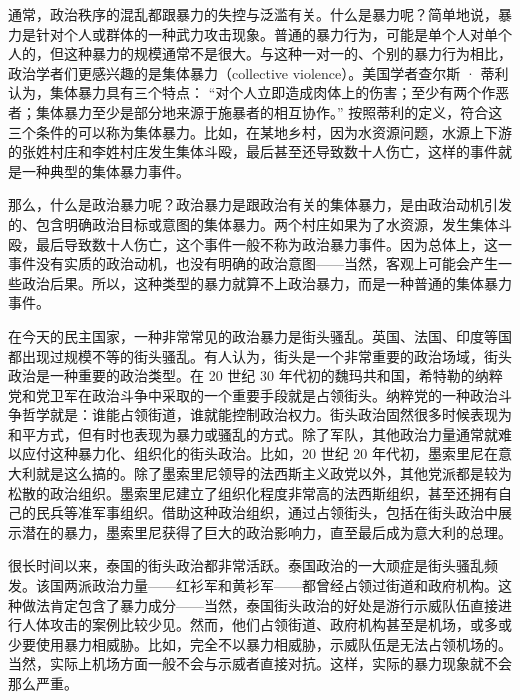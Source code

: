 
通常，政治秩序的混乱都跟暴力的失控与泛滥有关。什么是暴力呢？简单地说，暴力是针对个人或群体的一种武力攻击现象。普通的暴力行为，可能是单个人对单个人的，但这种暴力的规模通常不是很大。与这种一对一的、个别的暴力行为相比，政治学者们更感兴趣的是集体暴力（collective violence）。美国学者查尔斯 · 蒂利认为，集体暴力具有三个特点： “对个人立即造成肉体上的伤害；至少有两个作恶者；集体暴力至少是部分地来源于施暴者的相互协作。” 按照蒂利的定义，符合这三个条件的可以称为集体暴力。比如，在某地乡村，因为水资源问题，水源上下游的张姓村庄和李姓村庄发生集体斗殴，最后甚至还导致数十人伤亡，这样的事件就是一种典型的集体暴力事件。

那么，什么是政治暴力呢？政治暴力是跟政治有关的集体暴力，是由政治动机引发的、包含明确政治目标或意图的集体暴力。两个村庄如果为了水资源，发生集体斗殴，最后导致数十人伤亡，这个事件一般不称为政治暴力事件。因为总体上，这一事件没有实质的政治动机，也没有明确的政治意图——当然，客观上可能会产生一些政治后果。所以，这种类型的暴力就算不上政治暴力，而是一种普通的集体暴力事件。

在今天的民主国家，一种非常常见的政治暴力是街头骚乱。英国、法国、印度等国都出现过规模不等的街头骚乱。有人认为，街头是一个非常重要的政治场域，街头政治是一种重要的政治类型。在 20 世纪 30 年代初的魏玛共和国，希特勒的纳粹党和党卫军在政治斗争中采取的一个重要手段就是占领街头。纳粹党的一种政治斗争哲学就是：谁能占领街道，谁就能控制政治权力。街头政治固然很多时候表现为和平方式，但有时也表现为暴力或骚乱的方式。除了军队，其他政治力量通常就难以应付这种暴力化、组织化的街头政治。比如，20 世纪 20 年代初，墨索里尼在意大利就是这么搞的。除了墨索里尼领导的法西斯主义政党以外，其他党派都是较为松散的政治组织。墨索里尼建立了组织化程度非常高的法西斯组织，甚至还拥有自己的民兵等准军事组织。借助这种政治组织，通过占领街头，包括在街头政治中展示潜在的暴力，墨索里尼获得了巨大的政治影响力，直至最后成为意大利的总理。

很长时间以来，泰国的街头政治都非常活跃。泰国政治的一大顽症是街头骚乱频发。该国两派政治力量——红衫军和黄衫军——都曾经占领过街道和政府机构。这种做法肯定包含了暴力成分——当然，泰国街头政治的好处是游行示威队伍直接进行人体攻击的案例比较少见。然而，他们占领街道、政府机构甚至是机场，或多或少要使用暴力相威胁。比如，完全不以暴力相威胁，示威队伍是无法占领机场的。当然，实际上机场方面一般不会与示威者直接对抗。这样，实际的暴力现象就不会那么严重。

